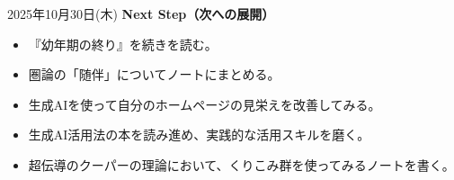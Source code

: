 \documentclass[dvipdfmx, autodetect-engine, aspectratio=169, 10.5pt]{beamer}
\begin{document}
\begin{frame}{2025年10月30日(木)}
	\textbf{Next Step（次への展開）}
	\begin{itemize}
		\item 『幼年期の終り』を続きを読む。
		\item 圏論の「随伴」についてノートにまとめる。
		\item 生成AIを使って自分のホームページの見栄えを改善してみる。
		\item 生成AI活用法の本を読み進め、実践的な活用スキルを磨く。
		\item 超伝導のクーパーの理論において、くりこみ群を使ってみるノートを書く。
	\end{itemize}
\end{frame}
\end{document}
